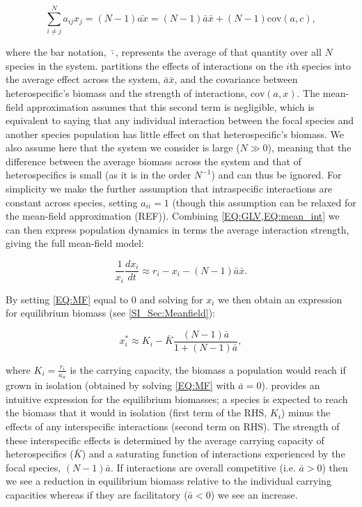 \documentclass{article}
\begin{document}
\begin{equation} \label{EQ:mean_int} 
    \sum^N_{i \neq j} a_{ij} x_j = (N-1) \bar{a x} = (N-1) \bar{a} \bar{x} + (N-1) \text{cov}(a,c),
\end{equation}

where the bar notation, $\bar{\cdot}$, represents the average of that quantity over all $N$ species in the system.  partitions the effects of interactions on the $i$th species into the average effect across the system, $\bar{a} \bar{x}$, and the covariance between heterospecific's biomass and the strength of interactions, $\text{cov}(a,x)$. The mean-field approximation assumes that this second term is negligible, which is equivalent to saying that any individual interaction between the focal species and another species population has little effect on that heterospecific's biomass. We also assume here that the system we consider is large ($N \gg 0$), meaning that the difference between the average biomass across the system and that of heterospecifics is small (as it is in the order $N^{-1}$) and can thus be ignored. For simplicity we make the further assumption that intraspecific interactions are constant across species, setting $a_{ii} = 1$ (though this assumption can be relaxed for the mean-field approximation (REF)). Combining \cref{EQ:GLV,EQ:mean_int} we can then express population dynamics in terms the average interaction strength, giving the full mean-field model:

\begin{equation} \label{EQ:MF}
    \frac{1}{x_i} \frac{dx_i}{dt} \approx r_i - x_i - (N-1)\bar{a}\bar{x}.
\end{equation}

By setting \cref{EQ:MF} equal to $0$ and solving for $x_i$ we then obtain an expression for equilibrium biomass (see \cref{SI_Sec:Meanfield}):

\begin{equation}\label{EQ:MF_eqi}
  x^*_i \approx K_i -  \bar{K}  \frac{ (N-1)\bar{a}}{1 + (N-1)\bar{a}}, 
\end{equation}

where $K_i = \frac{r_i}{a_{ii}}$ is the carrying capacity, the biomass a population would reach if grown in isolation (obtained by solving \cref{EQ:MF} with $\bar{a} = 0$).  provides an intuitive expression for the equilibrium biomasses; a species is expected to reach the biomass that it would in isolation (first term of the RHS, $K_i$) minus the effects of any interspecific interactions (second term on RHS). The strength of these interspecific effects is determined by the average carrying capacity of heterospecifics ($\bar{K}$) and a saturating function of interactions experienced by the focal species, $(N-1)\bar{a}$. If interactions are overall competitive (i.e. $ \bar{a} > 0$) then we see a reduction in equilibrium biomass relative to the individual carrying capacities whereas if they are facilitatory ($ \bar{a} < 0$) we see an increase.  
\end{document}
